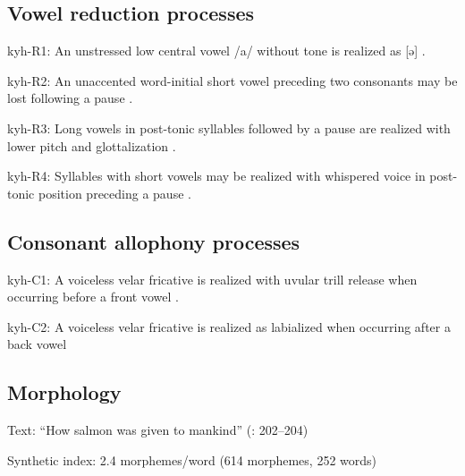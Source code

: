 {\subsection*{Vowel reduction processes}
\begin{appendixdesc}

\item[kyh-R1:] An unstressed low central vowel /a/ without tone is realized as [ə] \citep[11]{Bright1957}.

\item[kyh-R2:] An unaccented word-initial short vowel preceding two consonants may be lost following a pause \citep[53]{Bright1957}.

\item[kyh-R3:] Long vowels in post-tonic syllables followed by a pause are realized with lower pitch and glottalization \citep[13]{Bright1957}.

\item[kyh-R4:] Syllables with short vowels may be realized with whispered voice in post-tonic position preceding a pause \citep[13]{Bright1957}.
\end{appendixdesc}
\subsection*{Consonant allophony processes}
\begin{appendixdesc}

\item[kyh-C1:] A voiceless velar fricative is realized with uvular trill release when occurring before a front vowel \citep{Bright1957}.

\item[kyh-C2:] A voiceless velar fricative is realized as labialized when occurring after a back vowel \citep[8]{Bright1957}
\end{appendixdesc}
\subsection*{Morphology}

\begin{appendixdesc}

\item[Text:] “How salmon was given to mankind” (\citealt{DeAnguloFreeland1931}: 202--204)

\item[Synthetic index:] 2.4 morphemes/word (614 morphemes, 252 words)
\end{appendixdesc}
}
